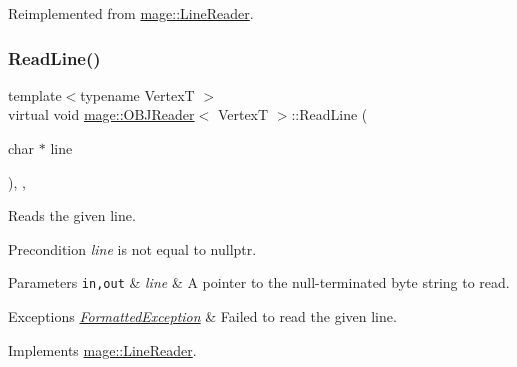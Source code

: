 Reimplemented from \hyperlink{classmage_1_1_line_reader_a4de135cfb0434be786cfcfd7959031ef}{mage\+::\+Line\+Reader}.

\hypertarget{classmage_1_1_o_b_j_reader_a8d4bd7be6de3098ba899cc36e3be1283}{}\label{classmage_1_1_o_b_j_reader_a8d4bd7be6de3098ba899cc36e3be1283} 
\subsubsection{\texorpdfstring{Read\+Line()}{ReadLine()}}
{\footnotesize\ttfamily template$<$typename VertexT $>$ \\
virtual void \hyperlink{classmage_1_1_o_b_j_reader}{mage\+::\+O\+B\+J\+Reader}$<$ VertexT $>$\+::Read\+Line (\begin{DoxyParamCaption}\item[{char $\ast$}]{line }\end{DoxyParamCaption})\hspace{0.3cm}{\ttfamily [override]}, {\ttfamily [private]}, {\ttfamily [virtual]}}

Reads the given line.

\begin{DoxyPrecond}{Precondition}
{\itshape line} is not equal to {\ttfamily nullptr}. 
\end{DoxyPrecond}

\begin{DoxyParams}[1]{Parameters}
\mbox{\tt in,out}  & {\em line} & A pointer to the null-\/terminated byte string to read. \\
\hline
\end{DoxyParams}

\begin{DoxyExceptions}{Exceptions}
{\em \hyperlink{structmage_1_1_formatted_exception}{Formatted\+Exception}} & Failed to read the given line. \\
\hline
\end{DoxyExceptions}


Implements \hyperlink{classmage_1_1_line_reader_acfb2f7279ec77d070a86d7db812d4745}{mage\+::\+Line\+Reader}.

\hypertarget{classmage_1_1_o_b_j_reader_a647cd7683007f351096702924ce46a3b}{}\label{classmage_1_1_o_b_j_reader_a647cd7683007f351096702924ce46a3b} 
